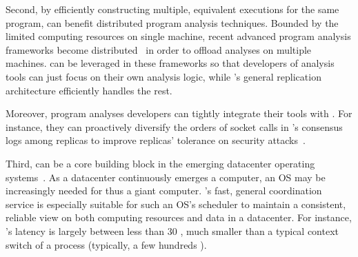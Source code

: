 

Second, by efficiently constructing multiple, equivalent executions for the 
same program, \xxx can benefit distributed program analysis techniques. Bounded 
by the limited computing resources on single machine, recent advanced 
program analysis frameworks become 
distributed~\cite{speck:asplos08,repframe:apsys15} in order to offload analyses 
on multiple machines. \xxx can be leveraged in these 
frameworks so that developers of analysis tools can just focus on their own 
analysis logic, while \xxx's general replication architecture efficiently 
handles the rest.

Moreover, program analyses developers can tightly integrate their tools with 
\xxx. For instance, they can proactively diversify the orders of socket calls 
in \xxx's consensus logs among replicas to improve replicas' tolerance on 
security attacks~\cite{con:hotpar12}.

% 


Third, \xxx can be a core building block in the emerging datacenter operating 
systems~\cite{matei:hotcloud11, mesos:nsdi11, datacenter:os}. As a 
datacenter continuously emerges a computer, an OS may be increasingly needed for 
thus a giant computer. \xxx's fast, general coordination service is especially 
suitable for such an OS's scheduler to maintain a consistent, reliable view on 
both computing resources and data in a datacenter. For instance, \xxx's 
latency is largely between less than 30 \us, much smaller than a typical 
context switch of a process (typically, a few hundreds \us).
